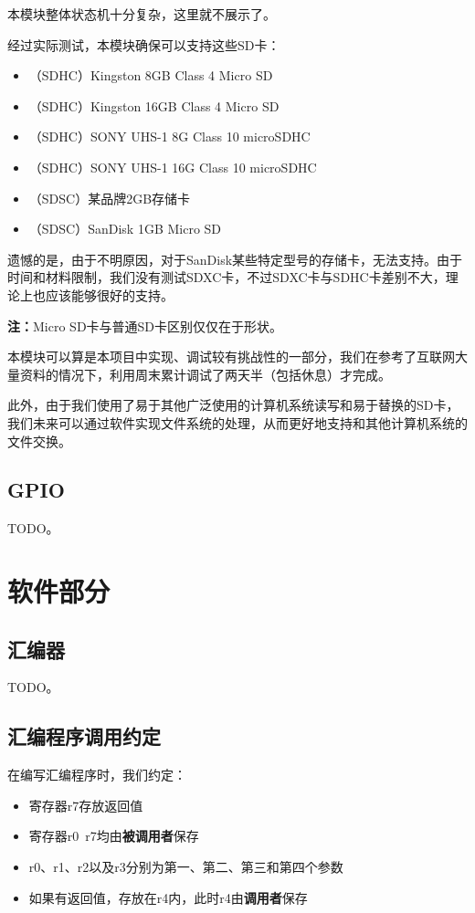 \documentclass[11pt,utf8]{report}
\begin{document}
	\par 本模块整体状态机十分复杂，这里就不展示了。
	
	\par 经过实际测试，本模块确保可以支持这些SD卡：
	
	\begin{itemize}
		\item （SDHC）Kingston 8GB Class 4 Micro SD
		\item （SDHC）Kingston 16GB Class 4 Micro SD
		\item （SDHC）SONY UHS-1 8G Class 10 microSDHC
		\item （SDHC）SONY UHS-1 16G Class 10 microSDHC
		\item （SDSC）某品牌2GB存储卡
		\item （SDSC）SanDisk 1GB Micro SD
	\end{itemize}
	
	\par 遗憾的是，由于不明原因，对于SanDisk某些特定型号的存储卡，无法支持。由于时间和材料限制，我们没有测试SDXC卡，不过SDXC卡与SDHC卡差别不大，理论上也应该能够很好的支持。
	
	\par \textbf{注：}Micro SD卡与普通SD卡区别仅仅在于形状。
	
	\par 本模块可以算是本项目中实现、调试较有挑战性的一部分，我们在参考了互联网大量资料的情况下，利用周末累计调试了两天半（包括休息）才完成。
	\par 此外，由于我们使用了易于其他广泛使用的计算机系统读写和易于替换的SD卡，我们未来可以通过软件实现文件系统的处理，从而更好地支持和其他计算机系统的文件交换。
	
\subsection{GPIO}
	\par TODO。

\section{软件部分}

\subsection{汇编器}
	\par TODO。
	
\subsection{汇编程序调用约定}
	\par 在编写汇编程序时，我们约定：
	\begin{itemize}
		\item 寄存器r7存放返回值
		\item 寄存器r0~r7均由\textbf{被调用者}保存
		\item r0、r1、r2以及r3分别为第一、第二、第三和第四个参数
		\item 如果有返回值，存放在r4内，此时r4由\textbf{调用者}保存
	\end{itemize}
\end{document}
